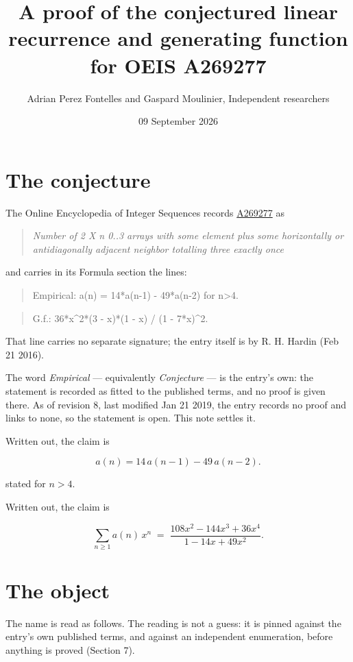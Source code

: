 \documentclass[11pt]{article}
\title{A proof of the conjectured linear recurrence and generating function for OEIS A269277}
\author{Adrian Perez Fontelles and Gaspard Moulinier, Independent researchers}
\date{09 September 2026}
\theoremstyle{definition}
\begin{document}
\maketitle
\section{The conjecture}

The Online Encyclopedia of Integer Sequences records \href{https://oeis.org/A269277}{A269277} as

\begin{quote}\itshape Number of 2 X n 0..3 arrays with some element plus some horizontally or antidiagonally adjacent neighbor totalling three exactly once\end{quote}

and carries in its Formula section the lines:

\begin{quote}\ttfamily Empirical: a(n) = 14*a(n-1) - 49*a(n-2) for n>4.\end{quote}

\begin{quote}\ttfamily G.f.: 36*x\textasciicircum{}2*(3 - x)*(1 - x) / (1 - 7*x)\textasciicircum{}2.\end{quote}

That line carries no separate signature; the entry itself is by R. H. Hardin (Feb 21 2016).

The word {\itshape Empirical} --- equivalently {\itshape Conjecture} --- is the entry's own: the statement is recorded as fitted to the published terms, and no proof is given there. As of revision 8, last modified Jan 21 2019, the entry records no proof and links to none, so the statement is open. This note settles it.

Written out, the claim is

\[a(n) = 14\,a(n-1) - 49\,a(n-2).\]

stated for $n > 4$.

Written out, the claim is

\[\sum_{n \ge 1} a(n)\,x^n \;=\; \frac{108x^{2} - 144x^{3} + 36x^{4}}{1 - 14x + 49x^{2}}.\]

\section{The object}

The name is read as follows. The reading is not a guess: it is pinned against the entry's own published terms, and against an independent enumeration, before anything is proved (Section 7).
\end{document}
